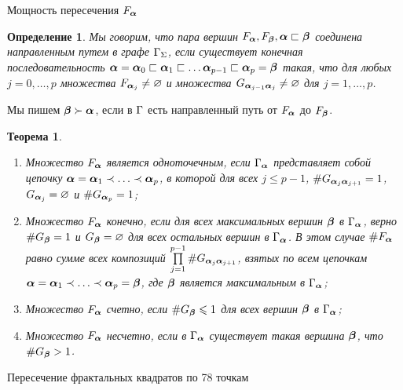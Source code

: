\documentclass[aspectratio=1610, 10pt, notheorems]{beamer}
\newtheorem{theorem}     {Теорема}
\newtheorem{definition}  {Определение}
\begin{document}
\begin{frame}{Мощность пересечения $F_{\bm{\alpha}}$}
\begin{definition}
Мы говорим, что пара вершин $F_{\bm{\alpha}}, F_{\bm{\beta}}, {\bm{\alpha}}\sqsubset{\bm{\beta}}$ {\em соединена направленным путем} в графе $\Gamma_\Sigma$, если существует конечная последовательность  ${\bm{\alpha}}={\bm{\alpha}}_0\sqsubset{\bm{\alpha}}_1\sqsubset\ldots {\bm{\alpha}}_{p-1}\sqsubset{\bm{\alpha}}_p={\bm{\beta}}$ такая, что для любых  $j=0,\ldots  ,p$ множества $F_{{\bm{\alpha}}_j}\neq\varnothing$  и множества $G_{{\bm{\alpha}}_{j-1}{\bm{\alpha}}_j}\neq\varnothing$ для $j=1,\ldots  ,p$.   
\end{definition}

Мы пишем ${\bm{\beta}}\succ{\bm{\alpha}}$, если в $\Gamma$ есть направленный путь от $F_{\bm{\alpha}}$ до $F_{\bm{\beta}}$.
\begin{theorem}
\begin{enumerate}%
\item[1] Множество $F_{\bm{\alpha}}$ является одноточечным, если $\Gamma_{\bm{\alpha}}$ представляет собой цепочку ${\bm{\alpha}}={\bm{\alpha}}_1\prec\ldots\prec{\bm{\alpha}}_p$, в которой для всех $j\le p-1$, $\# G_{{\bm{\alpha}}_j{\bm{\alpha}}_{j+1}}=1$, $G_{{\bm{\alpha}}_j}=\varnothing$ и $\#G_{{\bm{\alpha}}_p}=1$;
\item[2] Множество $F_{\bm{\alpha}}$ конечно, если для всех максимальных вершин ${\bm{\beta}}$ в $\Gamma_{\bm{\alpha}}$, верно $\#G_{\bm{\beta}}=1$ и $G_{{\bm{\beta}}}=\varnothing$ для всех остальных вершин в $\Gamma_{\bm{\alpha}}$.
В этом случае $\#F_{\bm{\alpha}}$ равно сумме всех композиций $\prod \limits_{j=1}^{p-1}\# G_{{\bm{\alpha}}_j{\bm{\alpha}}_{j+1}}$, взятых по всем цепочкам ${\bm{\alpha}}={\bm{\alpha}}_1\prec\ldots\prec{\bm{\alpha}}_p={\bm{\beta}}$, где ${\bm{\beta}}$ является максимальным в $\Gamma_{\bm{\alpha}}$;
\item[3] Множество $F_{\bm{\alpha}}$ счетно, если $\#G_{\bm{\beta}}\leqslant 1$ для всех вершин ${\bm{\beta}}$ в $\Gamma_{\bm{\alpha}}$;
\item[4] Множество $F_{\bm{\alpha}}$ несчетно, если в $\Gamma_{\bm{\alpha}}$ существует такая вершина ${\bm{\beta}}$, что $\#G_{\bm{\beta}}> 1$.
\end{enumerate}
\end{theorem}
\end{frame}


\begin{frame}{Пересечение фрактальных квадратов по 78 точкам}
\end{frame}
\end{document}
